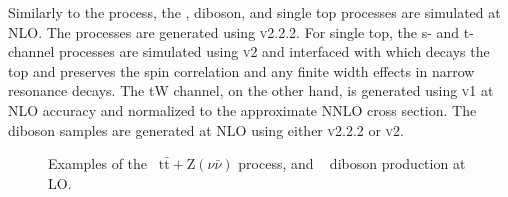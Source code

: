 Similarly to the \ttll process, the \ttV, diboson, and single top processes are simulated at NLO. The \ttV processes are generated using \AMCATNLO \textsc{v2.2.2}. For single top, the s- and t-channel processes are simulated using \POWHEG \textsc{v2} and interfaced with \MadSpin which decays the top and preserves the spin correlation and any finite width effects in narrow resonance decays. The tW channel, on the other hand, is generated using \POWHEG \textsc{v1} at NLO accuracy and normalized to the approximate NNLO cross section. The diboson samples are generated at NLO using either \AMCATNLO \textsc{v2.2.2} or \POWHEG \textsc{v2}.
 
\begin{figure}
  \begin{center}
    \hspace{1cm}
    \caption{Examples of the~\protect{} $\text{t}\bar{\text{t}}+\text{Z}(\nu\bar{\nu})$ process, and ~\protect{} diboson production at LO.}
    \label{fig:diboson_feyn}
  \end{center}
\end{figure}

